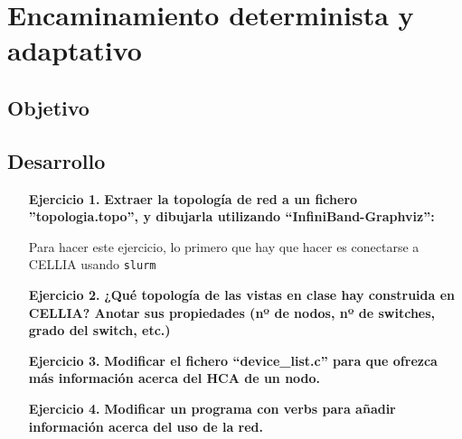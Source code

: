 \section{Encaminamiento determinista y adaptativo}\label{sec:p03intro}

\subsection{Objetivo}\label{ssec:p03objetivo}

\subsection{Desarrollo}\label{ssec:p03desarrollo}


\begin{itemize}
    \item [\textbf{Ejercicio 1.}] \textbf{Extraer la topología de red a un fichero ”topologia.topo”, y dibujarla utilizando “InfiniBand-Graphviz”:}

    Para hacer este ejercicio, lo primero que hay que hacer es conectarse a CELLIA usando \verb|slurm|

    \item [\textbf{Ejercicio 2.}] \textbf{¿Qué topología de las vistas en clase hay construida en CELLIA? Anotar sus propiedades (nº de nodos, nº de switches, grado del switch, etc.)}

    \item[\textbf{Ejercicio 3.}] \textbf{Modificar el fichero “device\_list.c” para que
ofrezca más información acerca del HCA de un nodo.} 

    \item[\textbf{Ejercicio 4.}] \textbf{Modificar un programa con verbs para añadir
información acerca del uso de la red.} 
    
\end{itemize}
